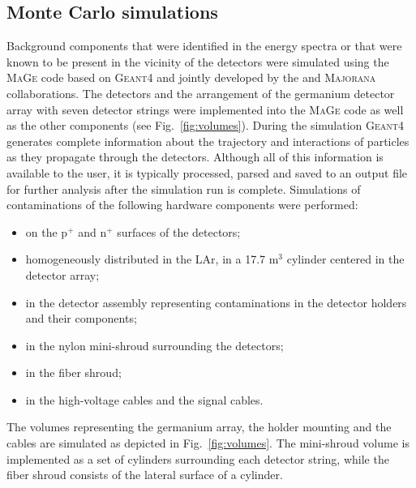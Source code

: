 \subsection*{Monte Carlo simulations}
Background components that were identified in the energy spectra or that were known to be present in the vicinity of the detectors were simulated using the \textsc{MaGe} \cite{MaGe} code based on \textsc{Geant4} \cite{geant4} and jointly developed by the {\gerda} and \textsc{Majorana} \cite{majoranadem} collaborations. The detectors and the arrangement of the germanium detector array with seven detector strings were implemented into the \textsc{MaGe} code as well as the other {\gerda} components (see Fig.~\ref{fig:volumes}). During the simulation \textsc{Geant4} generates complete information about the trajectory and interactions of particles as they propagate through the detectors. Although all of this information is available to the user, it is typically processed, parsed and saved to an output file for further analysis after the simulation run is complete. Simulations of contaminations of the following hardware components were performed:
\begin{itemize}
	\item on the p$^+$ and n$^+$ surfaces of the detectors;
	\item homogeneously distributed in the LAr, in a 17.7 m$^3$ cylinder centered in the detector array;
	\item in the detector assembly representing contaminations in the detector holders and their components;
	\item in the nylon mini-shroud surrounding the detectors;
	\item in the fiber shroud;
	\item in the high-voltage cables and the signal cables.
\end{itemize}
The volumes representing the germanium array, the holder mounting and the cables are simulated as depicted in Fig.~\ref{fig:volumes}. The mini-shroud volume is implemented as a set of cylinders surrounding each detector string, while the fiber shroud consists of the lateral surface of a cylinder.
